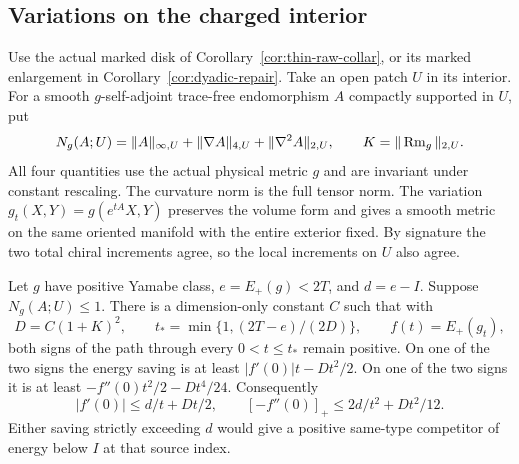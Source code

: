 \subsection{Variations on the charged interior}
\label{sec:core-variation}

Use the actual marked disk of Corollary~\ref{cor:thin-raw-collar},
or its marked enlargement in Corollary~\ref{cor:dyadic-repair}.
Take an open patch \(U\) in its interior. For a smooth
\(g\)-self-adjoint trace-free endomorphism \(A\) compactly supported
in \(U\), put
\[
 N_g(A;U)=\|A\|_{\infty,U}+\|\nabla A\|_{4,U}+\|\nabla^2A\|_{2,U},
 \qquad K=\|\operatorname{Rm}_g\|_{2,U}.
\]
All four quantities use the actual physical metric \(g\) and are
invariant under constant rescaling. The curvature norm is the full
tensor norm. The variation \(g_t(X,Y)=g(e^{tA}X,Y)\) preserves the
volume form and gives a smooth metric on the same oriented manifold
with the entire exterior fixed. By signature the two total chiral
increments agree, so the local increments on \(U\) also agree.

\begin{proposition}\label{prop:core-variation}
Let \(g\) have positive Yamabe class, \(e=E_+(g)<2T\), and
\(d=e-I\). Suppose \(N_g(A;U)\le1\).
There is a dimension-only constant \(C\) such that with
\[
 D=C(1+K)^2,\qquad
 t_* =\min\{1,(2T-e)/(2D)\},\qquad f(t)=E_+(g_t),
\]
both signs of the path through every \(0<t\le t_*\) remain
positive. On one of the two signs the energy saving is at least
\(\lvert f'(0)\rvert t-Dt^2/2\). On one of the two signs it is
at least \(-f''(0)t^2/2-Dt^4/24\). Consequently
\begin{equation}\label{eq:core-variation-bounds}
 |f'(0)|\le d/t+Dt/2,
 \qquad [-f''(0)]_+\le2d/t^2+Dt^2/12 .
\end{equation}
Either saving strictly exceeding \(d\) would give a positive
same-type competitor of energy below \(I\) at that source index.
\end{proposition}

